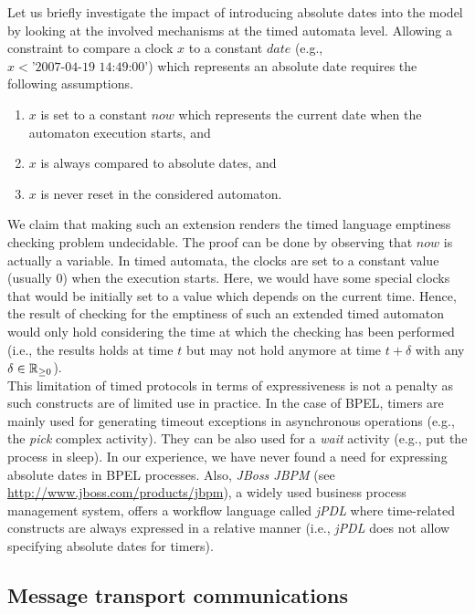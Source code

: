 Let us briefly investigate the impact of introducing absolute dates into the model by looking at the involved mechanisms at the timed automata level. Allowing a constraint to compare a clock $x$ to a constant $date$ (e.g., $x < \mbox{'2007-04-19 14:49:00'}$) which represents an absolute date requires the following assumptions.
\begin{enumerate}
    \item $x$ is set to a constant $now$ which represents the current date when the automaton execution starts, and
    \item $x$ is always compared to absolute dates, and
    \item $x$ is never reset in the considered automaton.
\end{enumerate}

We claim that making such an extension renders the timed language emptiness checking problem undecidable. The proof can be done by observing that $now$ is actually a variable. In timed automata, the clocks are set to a constant value (usually $0$) when the execution starts. Here, we would have some special clocks that would be initially set to a value which depends on the current time. Hence, the result of checking for the emptiness of such an extended timed automaton would only hold considering the time at which the checking has been performed (i.e., the results holds at time $t$ but may not hold anymore at time $t + \delta$ with any $\delta \in \mathbb{R}_{\geq 0}$).\\

This limitation of timed protocols in terms of expressiveness is not a penalty as such constructs are of limited use in practice. In the case of BPEL, timers are mainly used for generating timeout exceptions in asynchronous operations (e.g., the \emph{pick} complex activity). They can be also used for a \emph{wait} activity (e.g., put the process in sleep). In our experience, we have never found a need for expressing absolute dates in BPEL processes. Also, \emph{JBoss JBPM} (see \url{http://www.jboss.com/products/jbpm}), a widely used business process management system, offers a workflow language called \emph{jPDL} where time-related constructs are always expressed in a relative manner (i.e., \emph{jPDL} does not allow specifying absolute dates for timers).


\subsection{Message transport communications}

